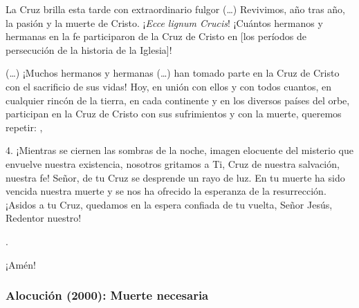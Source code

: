 \begin{body}
La Cruz brilla esta tarde con extraordinario fulgor (\ldots) Revivimos, año tras año, la pasión y la muerte de Cristo. ¡\textit{Ecce lignum Crucis}! ¡Cuántos hermanos y hermanas en la fe participaron de la Cruz de Cristo en [los períodos de persecución de la historia de la Iglesia]!

(\ldots) ¡Muchos hermanos y hermanas (\ldots) han tomado parte en la Cruz de Cristo con el sacrificio de sus vidas! Hoy, en unión con ellos y con todos cuantos, en cualquier rincón de la tierra, en cada continente y en los diversos países del orbe, participan en la Cruz de Cristo con sus sufrimientos y con la muerte, queremos repetir: , 

4. ¡Mientras se ciernen las sombras de la noche, imagen elocuente del misterio que envuelve nuestra existencia, nosotros gritamos a Ti, Cruz de nuestra salvación, nuestra fe! Señor, de tu Cruz se desprende un rayo de luz. En tu muerte ha sido vencida nuestra muerte y se nos ha ofrecido la esperanza de la resurrección. ¡Asidos a tu Cruz, quedamos en la espera confiada de tu vuelta, Señor Jesús, Redentor nuestro! 

.

¡Amén!
\end{body}

\subsubsection{Alocución (2000): Muerte necesaria}


